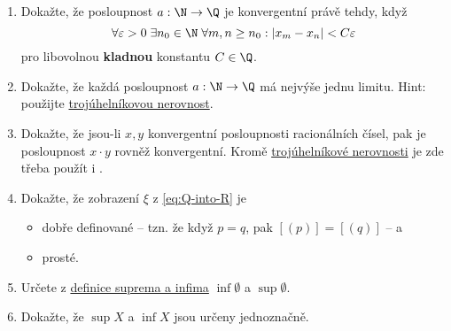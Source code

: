\section*{}

\begin{enumerate}
 \item Dokažte, že posloupnost $a:\N \to \Q$ je konvergentní právě tehdy, když
  \[
   \forall \varepsilon>0 \; \exists n_0 \in \N \; \forall m,n \geq n_0: |x_m -
   x_n| < C\varepsilon
  \]
  pro libovolnou \textbf{kladnou} konstantu $C \in \Q$.
 \item Dokažte, že každá posloupnost $a:\N \to \Q$ má nejvýše jednu limitu.
  Hint: použijte \hyperref[lem:trojuhelnikova-nerovnost]{trojúhelníkovou
  nerovnost}.
 \item Dokažte, že jsou-li $x,y$ konvergentní posloupnosti racionálních čísel,
  pak je posloupnost $x \cdot y$ rovněž konvergentní. Kromě
  \hyperref[lem:trojuhelnikova-nerovnost]{trojúhelníkové nerovnosti} je zde
  třeba použít i .
 \item Dokažte, že zobrazení $\xi$ z \eqref{eq:Q-into-R} je
  \begin{itemize}
   \item dobře definované -- tzn. že když $p = q$, pak $[(p)] = [(q)]$ -- a
   \item prosté.
  \end{itemize}
 \item Určete z \hyperref[def:supremum-a-infimum]{definice suprema a infima}
  $\inf \emptyset$ a $\sup \emptyset$.
 \item Dokažte, že $\sup X$ a $\inf X$ jsou určeny jednoznačně.
\end{enumerate}
